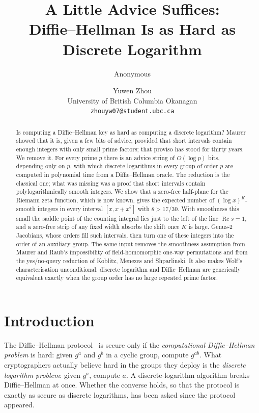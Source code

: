 \documentclass[11pt]{article}
\title{A Little Advice Suffices:\\ Diffie--Hellman Is as Hard as Discrete Logarithm}
\author{Anonymous}
\author{Yuwen Zhou\\[2pt] \normalsize University of British Columbia Okanagan\\
\normalsize\texttt{zhouyw07@student.ubc.ca}}
\date{}
\theoremstyle{remark}
\begin{document}
\maketitle

\begin{abstract}
Is computing a Diffie--Hellman key as hard as computing a discrete logarithm? Maurer showed that it is,
given a few bits of advice, provided that short intervals contain enough integers with only small prime
factors; that proviso has stood for thirty years. We remove it. For every prime $p$ there is an advice
string of $O(\log p)$ bits, depending only on $p$, with which discrete logarithms in every group of order $p$
are computed in polynomial time from a Diffie--Hellman oracle. The reduction is the classical one; what was
missing was a proof that short intervals contain polylogarithmically smooth integers. We show that a
zero-free half-plane for the Riemann zeta function, which is now known, gives the expected number of
$(\log x)^K$-smooth integers in every interval $[x,x+x^\theta]$ with $\theta>17/30$. With smoothness this
small the saddle point of the counting integral lies just to the left of the line $\operatorname{Re}s=1$,
and a zero-free strip of any fixed width absorbs the shift once $K$ is large. Genus-2 Jacobians, whose
orders fill such intervals, then turn one of these integers into the order of an auxiliary group. The same
input removes the smoothness assumption from Maurer and Raub's impossibility of field-homomorphic one-way
permutations and from the yes/no-query reduction of Koblitz, Menezes and Shparlinski. It also makes Wolf's
characterisation unconditional: discrete logarithm and Diffie--Hellman are generically equivalent exactly
when the group order has no large repeated prime factor.
\end{abstract}

\section{Introduction}\label{sec:intro}

The Diffie--Hellman protocol~\cite{DH76} is secure only if the \emph{computational Diffie--Hellman problem}
is hard: given $g^a$ and $g^b$ in a cyclic group, compute $g^{ab}$. What cryptographers actually believe
hard in the groups they deploy is the \emph{discrete logarithm problem}: given $g^a$, compute $a$. A
discrete-logarithm algorithm breaks Diffie--Hellman at once. Whether the converse holds, so that the
protocol is exactly as secure as discrete logarithms, has been asked since the protocol appeared.
\end{document}
